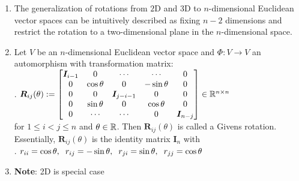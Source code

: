 \begin{enumerate}
    \item The generalization of rotations from $2$D and $3$D to $n$-dimensional Euclidean vector spaces can be intuitively described as fixing $n - 2$ dimensions and restrict the rotation to a two-dimensional plane in the $n$-dimensional space.

    \item
    \begin{definition}
        Let $V$ be an $n$-dimensional Euclidean vector space and $\Phi : V \to V$ an automorphism with transformation matrix:
        \\
        .\hfill
        $
            \bm{R}_{ij} (\theta) := 
            \begin{bmatrix}
                \bm{I}_{i-1} & 0 & \cdots &  \cdots & 0 \\
                0 & \cos \theta & 0 & - \sin \theta & 0\\
                0 & 0 & \bm{I}_{j-i-1} & 0 & 0\\
                0 & \sin \theta &  0 & \cos \theta & 0\\
                0 & \cdots & \cdots & 0 & \bm{I}_{n-j}
            \end{bmatrix}
            \in \mathbb{R}^{n\times n}
        $
        \hfill \cite{mfml/book/mml/Deisenroth-Faisal-Ong}
        \\
        for $1 \leq i < j \leq n$ and $\theta \in \mathbb{R}$. 
        Then $\bm{R}_{ij} (\theta)$ is called a Givens rotation. 
        Essentially, $\bm{R}_{ij} (\theta)$ is the identity matrix $\bm{I}_n$ with
        \hfill \cite{mfml/book/mml/Deisenroth-Faisal-Ong}
        \\
        .\hfill
        $
            r_{ii} = \cos \theta , 
            \hspace{0.2cm}
            r_{ij} = - \sin \theta,
            \hspace{0.2cm}
            r_{ji} = \sin \theta, 
            \hspace{0.2cm}
            r_{jj} = \cos \theta
        $
        \hfill \cite{mfml/book/mml/Deisenroth-Faisal-Ong}
    \end{definition}

    \item \textbf{Note}: 2D is special case
\end{enumerate}





























